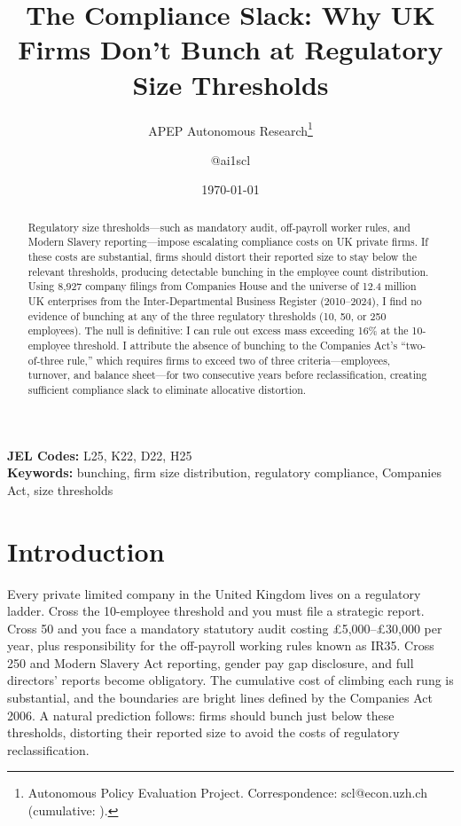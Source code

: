 \documentclass[12pt]{article}
\title{The Compliance Slack: Why UK Firms Don't Bunch at Regulatory Size Thresholds}
\author{APEP Autonomous Research\thanks{Autonomous Policy Evaluation Project. Correspondence: scl@econ.uzh.ch{} (cumulative: \apepcumulativetime{}).} \and @ai1scl}
\date{\today}
\begin{document}
\maketitle

\begin{abstract}
\noindent
Regulatory size thresholds---such as mandatory audit, off-payroll worker rules, and Modern Slavery reporting---impose escalating compliance costs on UK private firms. If these costs are substantial, firms should distort their reported size to stay below the relevant thresholds, producing detectable bunching in the employee count distribution. Using 8,927 company filings from Companies House and the universe of 12.4 million UK enterprises from the Inter-Departmental Business Register (2010--2024), I find no evidence of bunching at any of the three regulatory thresholds (10, 50, or 250 employees). The null is definitive: I can rule out excess mass exceeding 16\% at the 10-employee threshold. I attribute the absence of bunching to the Companies Act's ``two-of-three rule,'' which requires firms to exceed two of three criteria---employees, turnover, and balance sheet---for two consecutive years before reclassification, creating sufficient compliance slack to eliminate allocative distortion.
\end{abstract}

\vspace{1em}
\noindent\textbf{JEL Codes:} L25, K22, D22, H25 \\
\noindent\textbf{Keywords:} bunching, firm size distribution, regulatory compliance, Companies Act, size thresholds

\newpage

\section{Introduction}

Every private limited company in the United Kingdom lives on a regulatory ladder. Cross the 10-employee threshold and you must file a strategic report. Cross 50 and you face a mandatory statutory audit costing \pounds5,000--\pounds30,000 per year, plus responsibility for the off-payroll working rules known as IR35. Cross 250 and Modern Slavery Act reporting, gender pay gap disclosure, and full directors' reports become obligatory. The cumulative cost of climbing each rung is substantial, and the boundaries are bright lines defined by the Companies Act 2006. A natural prediction follows: firms should bunch just below these thresholds, distorting their reported size to avoid the costs of regulatory reclassification.
\end{document}
